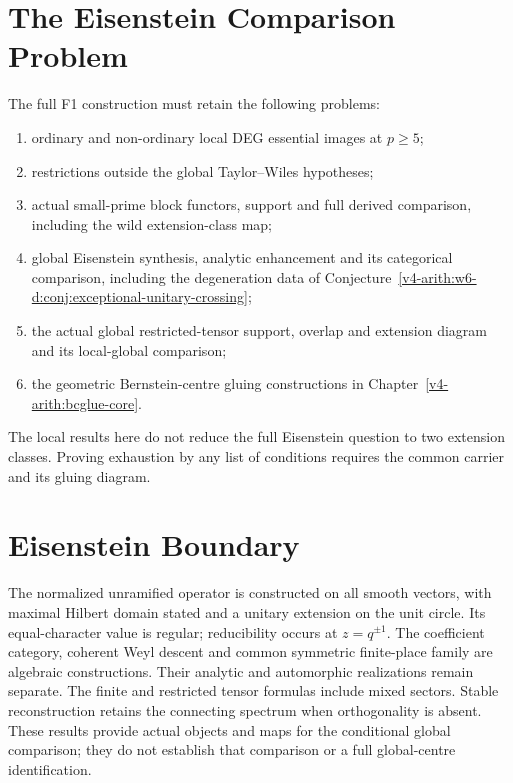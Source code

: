 \section{The Eisenstein Comparison Problem}
\label{v4-arith:w6-d:residual-table}
\begin{conjecture}
\label{v4-arith:w6-d:prop:F1-table-after-w6d}
The full F1 construction must retain the following problems:
\begin{enumerate}
\item ordinary and non-ordinary local DEG essential images at $p\ge5$;
\item restrictions outside the global Taylor--Wiles hypotheses;
\item actual small-prime block functors, support and full derived
comparison, including the wild extension-class map;
\item global Eisenstein synthesis, analytic enhancement and its
categorical comparison, including the degeneration data of
Conjecture~\ref{v4-arith:w6-d:conj:exceptional-unitary-crossing};
\item the actual global restricted-tensor support, overlap and extension
diagram and its local-global comparison;
\item the geometric Bernstein-centre gluing constructions in
Chapter~\ref{v4-arith:bcglue-core}.
\end{enumerate}
The local results here do not reduce the full Eisenstein question to
two extension classes. Proving exhaustion by any list of conditions
requires the common carrier and its gluing diagram.
\end{conjecture}

\section{Eisenstein Boundary}
\label{v4-arith:w6-d:summary}
The normalized unramified operator is constructed on all smooth
vectors, with maximal Hilbert domain stated and a unitary extension
on the unit circle. Its equal-character value is regular; reducibility
occurs at $z=q^{\pm1}$. The coefficient category, coherent Weyl
descent and common symmetric finite-place family are algebraic
constructions. Their analytic and automorphic realizations remain
separate. The finite and restricted tensor formulas include mixed
sectors. Stable reconstruction retains the connecting spectrum when
orthogonality is absent. These results provide actual objects and
maps for the conditional global comparison; they do not establish
that comparison or a full global-centre identification.

